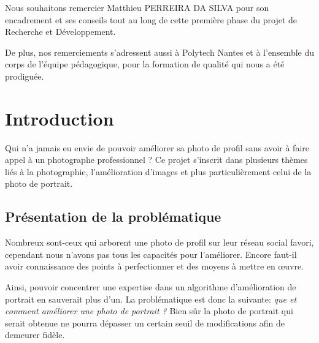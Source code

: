\documentclass[11pt, french]{report-rd-info}
\begin{document}
\begin{classification}
\end{classification}
\maketitle
\begin{acknowledgements}
Nous souhaitons remercier Matthieu PERREIRA DA SILVA pour son encadrement et ses conseils tout au long de cette première phase du projet de Recherche et Développement.

De plus, nos remerciements s'adressent aussi à Polytech Nantes et à l'ensemble du corps de l'équipe pédagogique, pour la formation de qualité qui nous a été prodiguée.
\end{acknowledgements}
\newpage
\tableofcontents
\chapter{Introduction}
Qui n'a jamais eu envie de pouvoir améliorer sa photo de profil sans avoir à faire appel à un photographe professionnel ? Ce projet s'inscrit dans plusieurs thèmes liés à la photographie, l'amélioration d'images et plus particulièrement celui de la photo de portrait.
\section{Présentation de la problématique}
Nombreux sont-ceux qui arborent une photo de profil sur leur réseau social favori, cependant nous n'avons pas tous les capacités pour l'améliorer. Encore faut-il avoir connaissance des points à perfectionner et des moyens à mettre en œuvre.

Ainsi, pouvoir concentrer une expertise dans un algorithme d'amélioration de portrait en sauverait plus d'un. La problématique est donc la suivante: \emph{que et comment améliorer une photo de portrait ?} Bien sûr la photo de portrait qui serait obtenue ne pourra dépasser un certain seuil de modifications afin de demeurer fidèle.
\end{document}
